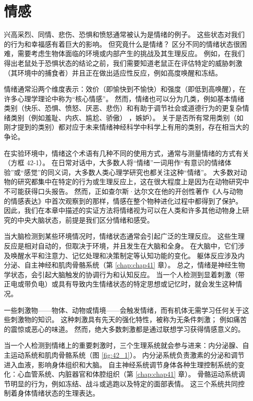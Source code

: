 \chapter{情感} \label{chap:chap42}

兴高采烈、同情、悲伤、恐惧和愤怒通常被认为是情绪的例子。 这些状态对我们的行为和幸福感有着巨大的影响。 但究竟什么是情绪？ 区分不同的情绪状态很困难，需要考虑生物体面临的环境或内部产生的挑战及其生理反应。 例如，在我们得出老鼠处于恐惧状态的结论之前，我们需要知道老鼠正在评估特定的威胁刺激（其环境中的捕食者）并且正在做出适应性反应，例如高度唤醒和冻结。

情绪通常沿两个维度表示：效价（即愉快到不愉快）和强度（即低到高唤醒），在许多心理学理论中称为“核心情感”。 然而，情绪也可以分为几类，例如基本情绪类别（快乐、恐惧、愤怒、厌恶、悲伤）和有助于调节社会或道德行为的更复杂情绪类别（例如羞耻、内疚、尴尬、骄傲） ，嫉妒）。 关于是否所有常用类别（如刚才提到的类别）都对应于未来情绪神经科学中科学上有用的类别，存在相当大的争论。

在实验环境中，情绪这个术语有几种不同的使用方式，通常与测量情绪的方式有关（方框 42-1）。 在日常对话中，大多数人将“情绪”一词用作“有意识的情绪体验”或“感觉”的同义词，大多数人类心理学研究也都关注这种“情绪”。 大多数对动物的研究都集中在特定的行为或生理反应上，这在很大程度上是因为在动物研究中不可能获得口头报告。 然而，正如查尔斯·达尔文在他的开创性著作《人与动物的情感表达》中首次观察到的那样，情感在整个物种进化过程中都得到了保护。 因此，我们在本章中描述的实证方法将情绪视为可以在人类和许多其他动物身上研究的中央大脑状态，前提是我们区分情绪和感受。

当大脑检测到某些环境情况时，情绪状态通常会引起广泛的生理反应。 这些生理反应是相对自动的，但取决于环境，并且发生在大脑和全身。 在大脑中，它们涉及唤醒水平和注意力、记忆处理和决策制定等认知功能的变化。 躯体反应涉及内分泌、自主神经和肌肉骨骼系统（第 \ref{chap:chap41} 章）。 总之，情绪是神经生物学状态，会引起大脑触发的协调行为和认知反应。 当一个人检测到显着刺激（带正电或带负电）或具有导致内生情绪状态的特定思想或记忆时，就会发生这种情况。

一些刺激物——物体、动物或情境——会触发情绪，而有机体无需学习任何关于这些刺激物的知识。 这种刺激具有先天的强化特性，被称为无条件刺激； 例如痛苦的震惊或恶心的味道。 然而，绝大多数刺激都是通过联想学习获得情感意义的。

当一个人检测到情绪上的重要刺激时，三个生理系统就会参与进来：内分泌腺、自主运动系统和肌肉骨骼系统（图 \ref{fig:42_1}）。 
内分泌系统负责激素的分泌和调节进入血液，影响身体组织和大脑。 自主神经系统调节身体各种生理控制系统的变化：心血管系统、内脏器官和体腔组织（第 \ref{chap:chap41} 章）。 骨骼运动系统调节明显的行为，例如冻结、战斗或逃跑以及特定的面部表情。 这三个系统共同控制着身体情绪状态的生理表达。

